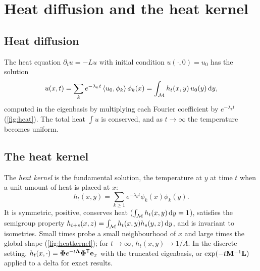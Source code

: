 \section{Heat diffusion and the heat kernel}

\subsection{Heat diffusion}

The heat equation $\partial_tu=-Lu$ with initial condition $u(\cdot,0)=u_0$ has the solution
\begin{equation}
u(x,t)=\sum_ke^{-\lambda_kt}\left\langle u_0,\phi_k\right\rangle\phi_k(x)=\int_{\mathcal{M}} h_t(x,y)\,u_0(y)\,\mathrm{d} y ,
\end{equation}
computed in the eigenbasis by multiplying each Fourier coefficient by $e^{-\lambda_kt}$
(\cref{fig:heat}). The total heat $\int u$ is conserved, and as $t\to\infty$ the temperature becomes
uniform.


\subsection{The heat kernel}

The \emph{heat kernel} is the fundamental solution, the temperature at $y$ at time $t$ when a unit
amount of heat is placed at $x$:
\begin{equation}
h_t(x,y)=\sum_{k\ge1}e^{-\lambda_kt}\phi_k(x)\phi_k(y) .
\end{equation}
It is symmetric, positive, conserves heat ($\int_{\mathcal{M}} h_t(x,y)\,\mathrm{d} y=1$), satisfies the semigroup property
$h_{t+s}(x,z)=\int_{\mathcal{M}} h_t(x,y)h_s(y,z)\,\mathrm{d} y$, and is invariant to isometries. Small times probe a small
neighbourhood of $x$ and large times the global shape (\cref{fig:heatkernel}); for $t\to\infty$,
$h_t(x,y)\to1/A$. In the discrete setting, $h_t(x,\cdot)=\boldsymbol{\Phi} e^{-t\boldsymbol{\Lambda}}\boldsymbol{\Phi}^{\mathsf{T}}\mathbf{e}_x$ with the
truncated eigenbasis, or $\exp(-t\mathbf{M}^{-1}\mathbf{L})$ applied to a delta for exact results.


